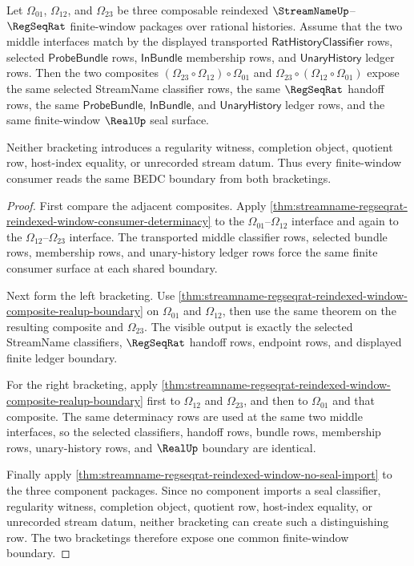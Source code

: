 \begin{theorem}
\label{thm:streamname-regseqrat-reindexed-window-composition-associativity}
Let $\Omega_{01}$, $\Omega_{12}$, and $\Omega_{23}$ be three composable
reindexed $\StreamNameUp$--$\RegSeqRat$ finite-window packages over rational
histories. Assume that the two middle interfaces match by the displayed
transported $\mathsf{RatHistoryClassifier}$ rows, selected
$\mathsf{ProbeBundle}$ rows, $\mathsf{InBundle}$ membership rows, and
$\mathsf{UnaryHistory}$ ledger rows. Then the two composites
$(\Omega_{23}\circ\Omega_{12})\circ\Omega_{01}$ and
$\Omega_{23}\circ(\Omega_{12}\circ\Omega_{01})$ expose the same selected
StreamName classifier rows, the same $\RegSeqRat$ handoff rows, the same
$\mathsf{ProbeBundle}$, $\mathsf{InBundle}$, and $\mathsf{UnaryHistory}$
ledger rows, and the same finite-window $\RealUp$ seal surface.

Neither bracketing introduces a regularity witness, completion object, quotient
row, host-index equality, or unrecorded stream datum. Thus every
finite-window consumer reads the same BEDC boundary from both bracketings.
\end{theorem}
\begin{proof}
First compare the adjacent composites. Apply
\autoref{thm:streamname-regseqrat-reindexed-window-consumer-determinacy} to
the $\Omega_{01}$--$\Omega_{12}$ interface and again to the
$\Omega_{12}$--$\Omega_{23}$ interface. The transported middle classifier
rows, selected bundle rows, membership rows, and unary-history ledger rows
force the same finite consumer surface at each shared boundary.

Next form the left bracketing. Use
\autoref{thm:streamname-regseqrat-reindexed-window-composite-realup-boundary}
on $\Omega_{01}$ and $\Omega_{12}$, then use the same theorem on the resulting
composite and $\Omega_{23}$. The visible output is exactly the selected
StreamName classifiers, $\RegSeqRat$ handoff rows, endpoint rows, and displayed
finite ledger boundary.

For the right bracketing, apply
\autoref{thm:streamname-regseqrat-reindexed-window-composite-realup-boundary}
first to $\Omega_{12}$ and $\Omega_{23}$, and then to $\Omega_{01}$ and that
composite. The same determinacy rows are used at the same two middle
interfaces, so the selected classifiers, handoff rows, bundle rows, membership
rows, unary-history rows, and $\RealUp$ boundary are identical.

Finally apply
\autoref{thm:streamname-regseqrat-reindexed-window-no-seal-import} to the
three component packages. Since no component imports a seal classifier,
regularity witness, completion object, quotient row, host-index equality, or
unrecorded stream datum, neither bracketing can create such a distinguishing
row. The two bracketings therefore expose one common finite-window boundary.
\end{proof}

